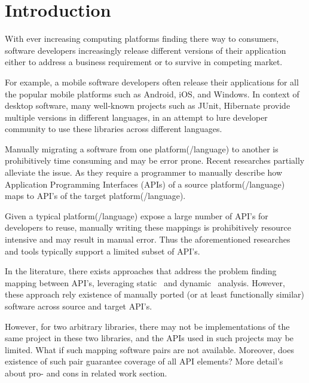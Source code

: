 \vspace*{-2ex}
\section{Introduction}
\label{sec:introduction}
\vspace*{-1ex}

With ever increasing computing platforms finding there way to consumers, software developers increasingly release different versions of their application either to address a business requirement or to survive in competing market.

For example, a mobile software developers often release their applications for all the popular mobile platforms such as Android, iOS, and Windows. In context of desktop software, many well-known projects such as JUnit, Hibernate provide multiple versions in different languages, in an attempt to lure developer community to use these libraries across different languages.

Manually migrating a software from one platform(/language) to another is prohibitively time consuming and may be error prone. Recent researches partially alleviate the issue. As they require a programmer to manually describe how Application Programming Interfaces (APIs) of a source platform(/language) maps to API's of the target platform(/language). 

Given a typical platform(/language) expose a large number of API's for developers to reuse, manually writing these mappings is prohibitively resource intensive and may result in manual error. Thus the aforementioned researches and tools typically support a limited subset of API's.

In the literature, there exists approaches that address the problem finding mapping between API's, leveraging static~\cite{Zhong2010ICSE} and dynamic~\cite{Gokhale2013ICSE} analysis. However, these approach rely existence of manually ported (or at least functionally similar) software across source and target API's. 


However, for two arbitrary libraries, there may not be implementations of the same project in these two libraries, and the APIs used in such projects may be limited. What if such mapping software pairs are not available. Moreover, does existence of such pair guarantee coverage of all API elements? More detail's about pro- and cons in related work section.

